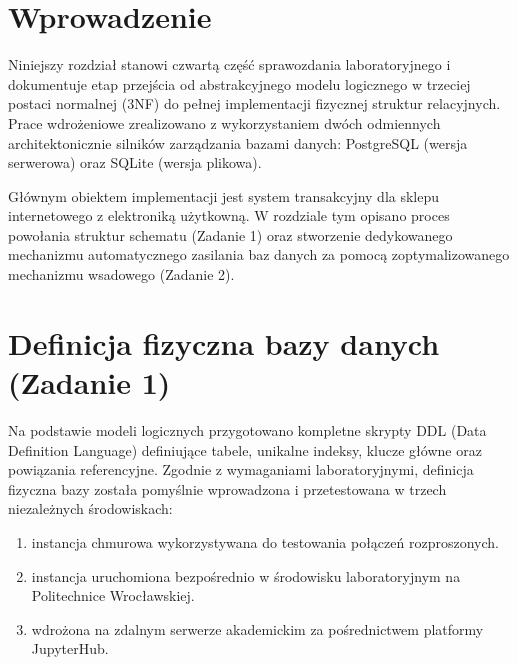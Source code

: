 \documentclass[letterpaper,10pt,polish]{sphinxmanual}
\begin{document}
\section{Wprowadzenie}
\label{\detokenize{rozdzia_u0142_4/BD_WprowadzanieBD/index:wprowadzenie}}
\sphinxAtStartPar
Niniejszy rozdział stanowi czwartą część sprawozdania laboratoryjnego i dokumentuje etap przejścia od abstrakcyjnego modelu logicznego w trzeciej postaci normalnej (3NF) do pełnej implementacji fizycznej struktur relacyjnych. Prace wdrożeniowe zrealizowano z wykorzystaniem dwóch odmiennych architektonicznie silników zarządzania bazami danych: PostgreSQL (wersja serwerowa) oraz SQLite (wersja plikowa).

\sphinxAtStartPar
Głównym obiektem implementacji jest system transakcyjny dla sklepu internetowego z elektroniką użytkowną. W rozdziale tym opisano proces powołania struktur schematu (Zadanie 1) oraz stworzenie dedykowanego mechanizmu automatycznego zasilania baz danych za pomocą zoptymalizowanego mechanizmu wsadowego (Zadanie 2).


\section{Definicja fizyczna bazy danych (Zadanie 1)}
\label{\detokenize{rozdzia_u0142_4/BD_WprowadzanieBD/index:definicja-fizyczna-bazy-danych-zadanie-1}}
\sphinxAtStartPar
Na podstawie modeli logicznych przygotowano kompletne skrypty DDL (Data Definition Language) definiujące tabele, unikalne indeksy, klucze główne oraz powiązania referencyjne. Zgodnie z wymaganiami laboratoryjnymi, definicja fizyczna bazy została pomyślnie wprowadzona i przetestowana w trzech niezależnych środowiskach:
\begin{enumerate}
%
\item {} 
\sphinxAtStartPar
{} \textendash{} instancja chmurowa wykorzystywana do testowania połączeń rozproszonych.

\item {} 
\sphinxAtStartPar
{} \textendash{} instancja uruchomiona bezpośrednio w środowisku laboratoryjnym na Politechnice Wrocławskiej.

\item {} 
\sphinxAtStartPar
{} \textendash{} wdrożona na zdalnym serwerze akademickim za pośrednictwem platformy JupyterHub.

\end{enumerate}
\end{document}
